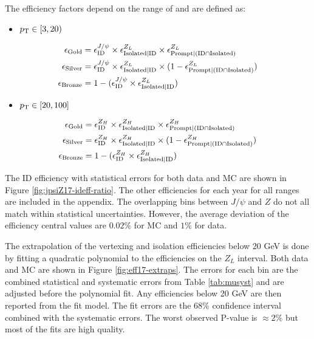  The efficiency factors depend on the range of \pt and are defined as:


\begin{itemize}
\item[] $p_{\mathrm{T}} \in [3,20)$
\end{itemize}
\begin{equation}\label{eq:effcomp_J}
\begin{split}
\epsilon_{\text{Gold}}& = \epsilon_{\text{ID}}^{J/\psi}\times \epsilon_{\text{Isolated}|\text{ID}}^{Z_L} \times \epsilon_{\text{Prompt}|(\text{ID} \cap \text{Isolated})}^{Z_L} \\
\epsilon_{\text{Silver}}& = \epsilon_{\text{ID}}^{J/\psi} \times \epsilon_{\text{Isolated}|\text{ID}}^{Z_L} \times (1-\epsilon_{\text{Prompt}|(\text{ID} \cap \text{Isolated})}^{Z_L}) \\
\epsilon_{\text{Bronze}}& = 1-(\epsilon_{\text{ID}}^{J/\psi} \times \epsilon_{\text{Isolated}|\text{ID}}^{Z_L})
\end{split}
\end{equation}
\begin{itemize}
\item[] $p_{\mathrm{T}} \in [20,100 ]$
\end{itemize}
\begin{equation}\label{eq:effcomp_Z}
\begin{split}
\epsilon_{\text{Gold}}& = \epsilon_{\text{ID}}^{Z_H}\times\epsilon_{\text{Isolated}|\text{ID}}^{Z_H}\times\epsilon_{\text{Prompt}|(\text{ID} \cap \text{Isolated})}^{Z_H} \\
\epsilon_{\text{Silver}}& = \epsilon_{\text{ID}}^{Z_H}\times\epsilon_{\text{Isolated}|\text{ID}}^{Z_H}\times(1-\epsilon_{\text{Prompt}|(\text{ID} \cap \text{Isolated})}^{Z_H})\\
\epsilon_{\text{Bronze}}& = 1-(\epsilon_{\text{ID}}^{Z_H} \times \epsilon_{\text{Isolated}|\text{ID}}^{Z_H})
\end{split}
\end{equation}

 The ID efficiency with statistical errors for both data and MC are shown in Figure \ref{fig:jpsiZ17-ideff-ratio}. The other efficiencies for each year for all \pt ranges are included in the appendix. The overlapping bins between $J/\psi$ and $Z$ do not all match within statistical uncertainties. However, the average deviation of the efficiency central values are $0.02\%$ for MC and $1\%$ for data.  



The extrapolation of the vertexing and isolation efficiencies below 20 GeV is done by fitting a quadratic polynomial to the efficiencies on the $Z_L$ interval.  Both data and MC are shown in Figure \ref{fig:eff17-extraps}.  The errors for each bin are the combined statistical and systematic errors from Table \ref{tab:musyst} and are adjusted before the polynomial fit. Any efficiencies below 20 GeV are then reported from the fit model. The fit errors are the 68\% confidence interval combined with the systematic errors. The worst observed P-value is $\approx 2\%$ but most of the fits are high quality.

